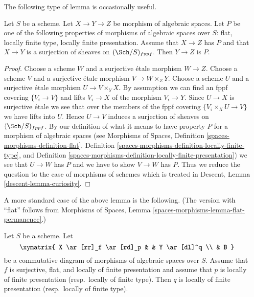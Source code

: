 \noindent
The following type of lemma is occasionally useful.

\begin{lemma}
\label{lemma-curiosity}
Let $S$ be a scheme. Let $X \to Y \to Z$ be morphism of algebraic spaces.
Let $P$ be one of the following properties of morphisms of algebraic spaces
over $S$:
flat, locally finite type, locally finite presentation.
Assume that $X \to Z$ has $P$ and that
$X \to Y$ is a surjection of sheaves on $(\Sch/S)_{fppf}$.
Then $Y \to Z$ is $P$.
\end{lemma}

\begin{proof}
Choose a scheme $W$ and a surjective \'etale morphism $W \to Z$.
Choose a scheme $V$ and a surjective \'etale morphism $V \to W \times_Z Y$.
Choose a scheme $U$ and a surjective \'etale morphism $U \to V \times_Y X$.
By assumption we can find an fppf covering $\{V_i \to V\}$ and
lifts $V_i \to X$ of the morphism $V_i \to Y$. Since $U \to X$ is surjective
\'etale we see that over the members of the fppf covering
$\{V_i \times_X U \to V\}$ we have lifts into $U$. Hence $U \to V$ induces
a surjection of sheaves on $(\Sch/S)_{fppf}$.
By our definition of what it means to have property $P$ for a
morphism of algebraic spaces (see
Morphisms of Spaces,
Definition \ref{spaces-morphisms-definition-flat},
Definition \ref{spaces-morphisms-definition-locally-finite-type}, and
Definition \ref{spaces-morphisms-definition-locally-finite-presentation})
we see that $U \to W$ has $P$ and we have to show $V \to W$ has $P$.
Thus we reduce the question to the case of morphisms of schemes
which is treated in
Descent, Lemma \ref{descent-lemma-curiosity}.
\end{proof}

\noindent
A more standard case of the above lemma is the following.
(The version with ``flat'' follows from
Morphisms of Spaces, Lemma \ref{spaces-morphisms-lemma-flat-permanence}.)

\begin{lemma}
\label{lemma-flat-finitely-presented-permanence}
Let $S$ be a scheme. Let
$$
\xymatrix{
X \ar[rr]_f \ar[rd]_p & &
Y \ar[dl]^q \\
& B
}
$$
be a commutative diagram of morphisms of algebraic spaces over $S$.
Assume that $f$ is surjective, flat, and locally of finite presentation
and assume that $p$ is locally of finite presentation (resp.\ locally
of finite type). Then $q$ is locally of finite presentation
(resp.\ locally of finite type).
\end{lemma}

